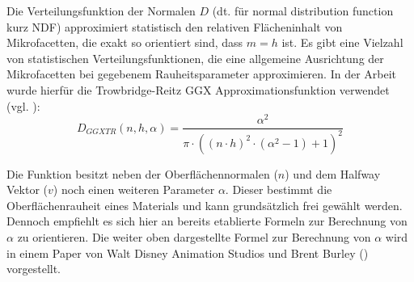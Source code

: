 \documentclass[
  11pt,
  a4paper,
  oneside
  ]{article}
\begin{document}
Die Verteilungsfunktion der Normalen $D$ (dt. für normal distribution function kurz NDF) approximiert statistisch den relativen Flächeninhalt von Mikrofacetten, die exakt so orientiert sind, dass $m = h$ ist. Es gibt eine Vielzahl von statistischen Verteilungsfunktionen, die eine allgemeine Ausrichtung der Mikrofacetten bei gegebenem Rauheitsparameter approximieren. In der Arbeit wurde hierfür die Trowbridge-Reitz GGX Approximationsfunktion verwendet (vgl. \cite{learnOpenGL}):
\begin{equation}
  D_{GGXTR}\left( n,h,\alpha \right) =\dfrac{\alpha ^{2}}{\pi \cdot \left( \left( n\cdot h\right) ^{2}\cdot \left( \alpha ^{2}-1\right) +1\right) ^{2}}
\end{equation}

Die Funktion besitzt neben der Oberflächennormalen ($n$) und dem Halfway Vektor ($v$) noch einen weiteren Parameter $\alpha$. Dieser bestimmt die Oberflächenrauheit eines Materials und kann grundsätzlich frei gewählt werden. Dennoch empfiehlt es sich hier an bereits etablierte Formeln zur Berechnung von $\alpha$ zu orientieren. Die weiter oben dargestellte Formel zur Berechnung von $\alpha$ wird in einem Paper von Walt Disney Animation Studios und Brent Burley (\cite{Burley2012PhysicallyBasedSA}) vorgestellt.
\end{document}
